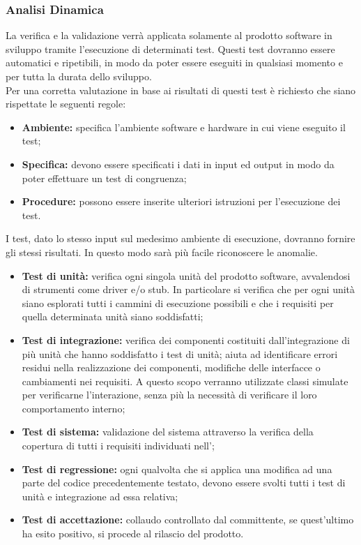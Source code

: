 		\subsubsection{Analisi Dinamica}
		La verifica e la validazione\gloss{} verrà applicata solamente al prodotto software in sviluppo tramite l'esecuzione di determinati test. Questi test dovranno essere automatici e ripetibili, in modo da poter essere eseguiti in qualsiasi momento e per tutta la durata dello sviluppo.\\
		Per una corretta valutazione in base ai risultati di questi test è richiesto che siano rispettate le seguenti regole:
		\begin{itemize}
			\item \textbf{Ambiente:} specifica l'ambiente software e hardware in cui viene eseguito il test;
			\item \textbf{Specifica:} devono essere specificati i dati in input ed output in modo da poter effettuare un test di congruenza;
			\item \textbf{Procedure:} possono essere inserite ulteriori istruzioni per l'esecuzione dei test.
		\end{itemize}
		I test, dato lo stesso input sul medesimo ambiente di esecuzione, dovranno fornire gli stessi risultati. In questo modo sarà più facile riconoscere le anomalie.
			\begin{itemize}
				\item \textbf{Test di unità:} verifica ogni singola unità del prodotto software, avvalendosi di strumenti come driver\gloss{} e/o stub\gloss{}. In particolare si verifica che per ogni unità siano esplorati tutti i cammini di esecuzione possibili e che i requisiti per quella determinata unità siano soddisfatti;
				\item \textbf{Test di integrazione:} verifica dei componenti costituiti dall'integrazione di più unità che hanno soddisfatto i test di unità; aiuta ad identificare errori residui nella realizzazione dei componenti, modifiche delle interfacce o cambiamenti nei requisiti. A questo scopo verranno utilizzate classi simulate per verificarne l'interazione, senza più la necessità di verificare il loro comportamento interno;
				\item \textbf{Test di sistema:} validazione\gloss{} del sistema attraverso la verifica della copertura di tutti i requisiti individuati nell'\docNameVersionAdR;
				\item \textbf{Test di regressione:} ogni qualvolta che si applica una modifica ad una parte del codice precedentemente testato, devono essere svolti tutti i test di unità e integrazione ad essa relativa;
				\item \textbf{Test di accettazione:} collaudo controllato dal committente\gloss{}, se quest'ultimo ha esito positivo, si procede al rilascio del prodotto.
			\end{itemize}

